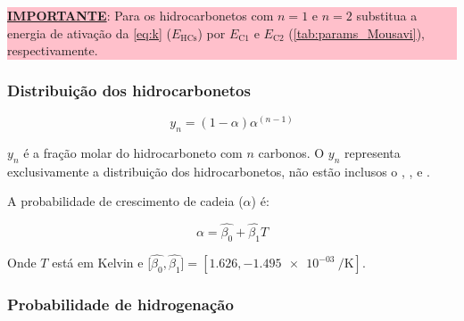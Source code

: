 \documentclass[portuguese,12pt,a4paper,onecolumn]{article}
\begin{document}
	\colorbox{pink}{\parbox{\textwidth}{
			\textbf{\underline{IMPORTANTE}}: Para os hidrocarbonetos com $n = 1$ e $n = 2$ substitua a energia de ativação da \autoref{eq:k} ($E_\mathrm{HCs}$) por $E_{\mathrm{C1}}$ e $E_{\mathrm{C2}}$ (\autoref{tab:params_Mousavi}), respectivamente.
		}}
	
	\begin{table}[!h]
		\centering
		\caption{Parâmetros das Equações \ref{eq:r_HCs}, \ref{eq:k} e \ref{eq:K_CO}.}
		\label{tab:params_Mousavi}
	\end{table}
		
	\subsubsection{Distribuição dos hidrocarbonetos}
	
	\begin{equation}
		y_n = (1 - \alpha) \alpha^{(n - 1)}
		\label{eq:alpha}
	\end{equation}
	
	$y_n$ é a fração molar do hidrocarboneto com $n$ carbonos. O $y_n$ representa exclusivamente a distribuição dos hidrocarbonetos, não estão inclusos o , ,  e .
	
	A probabilidade de crescimento de cadeia ($\alpha$) é:
	
	\begin{equation}
		\alpha = \hat{\beta_0} + \hat{\beta_1} T
	\end{equation}

	Onde $T$ está em Kelvin e [$\hat{\beta_0}, \hat{\beta_1}] = [\num{1.626}, \qty{-1.495e-03}{\per \kelvin}]$.
	
	\subsubsection{Probabilidade de hidrogenação}
	
\end{document}
